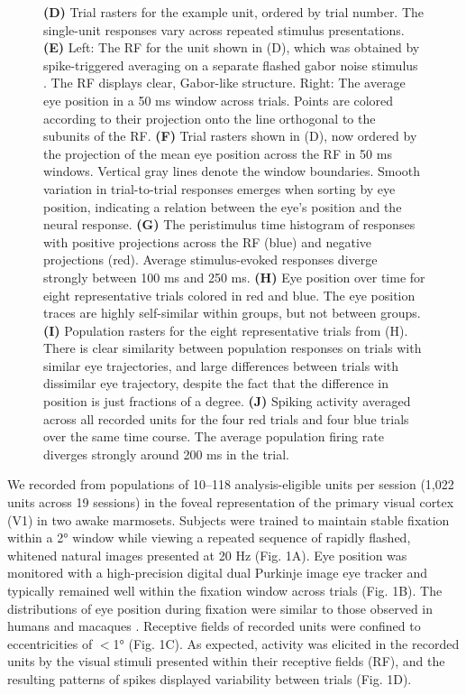 \documentclass{lite}
\begin{document}
\begin{figure}[!t]
    \ContinuedFloat
    \caption[]{
    \textbf{(D)} Trial rasters for the example unit, ordered by trial number. The single-unit responses vary across repeated stimulus presentations. 
    \textbf{(E)} Left: The RF for the unit shown in (D), which was obtained by spike-triggered averaging on a separate flashed gabor noise stimulus \cite{yates2023detailed}. The RF displays clear, Gabor-like structure. Right: The average eye position in a 50 ms window across trials. Points are colored according to their projection onto the line orthogonal to the subunits of the RF. 
    \textbf{(F)} Trial rasters shown in (D), now ordered by the projection of the mean eye position across the RF in 50 ms windows. Vertical gray lines denote the window boundaries. Smooth variation in trial-to-trial responses emerges when sorting by eye position, indicating a relation between the eye's position and the neural response. 
    \textbf{(G)} The peristimulus time histogram of responses with positive projections across the RF (blue) and negative projections (red). Average stimulus-evoked responses diverge strongly between 100 ms and 250 ms. 
    \textbf{(H)}  Eye position over time for eight representative trials colored in red and blue. The eye position traces are highly self-similar within groups, but not between groups. 
    \textbf{(I)} Population rasters for the eight representative trials from (H). There is clear similarity between population responses on trials with similar eye trajectories, and large differences between trials with dissimilar eye trajectory, despite the fact that the difference in position is just fractions of a degree. 
    \textbf{(J)} Spiking activity averaged across all recorded units for the four red trials and four blue trials over the same time course. The average population firing rate diverges strongly around 200 ms in the trial. 
    }
\end{figure}


We recorded from populations of 10--118 analysis-eligible units per session (1,022 units across 19 sessions) in the foveal representation of the primary visual cortex (V1) in two awake marmosets. Subjects were trained to maintain stable fixation within a 2° window while viewing a repeated sequence of rapidly flashed, whitened natural images presented at 20 Hz (Fig. 1A). Eye position was monitored with a high-precision digital dual Purkinje image eye tracker \cite{wu2023high, ressmeyer2025openirisdpi, yates2023detailed} and typically remained well within the fixation window across trials (Fig. 1B). The distributions of eye position during fixation were similar to those observed in humans and macaques \cite{cherici2012precision, ressmeyer2025openirisdpi}. Receptive fields of recorded units were confined to eccentricities of $<$1° (Fig. 1C). As expected, activity was elicited in the recorded units by the visual stimuli presented within their receptive fields (RF), and the resulting patterns of spikes displayed variability between trials (Fig. 1D).
\end{document}
